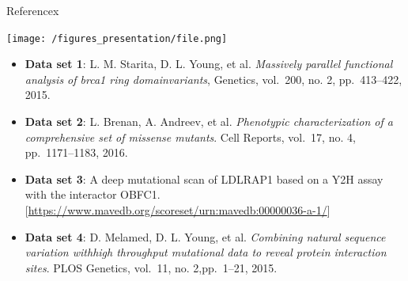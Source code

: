 \documentclass[ignorenonframetext,]{beamer}
\providecommand{\tightlist}{%
  \setlength{\itemsep}{0pt}\setlength{\parskip}{0pt}}
\begin{document}
\begin{frame}{Referencex}
\protect\hypertarget{referencex}{}

\texttt{[image: /figures\_presentation/file.png]}

\begin{itemize}
\tightlist
\item
  \textbf{Data set 1}: L. M. Starita, D. L. Young, et al.
  \emph{Massively parallel functional analysis of brca1 ring
  domainvariants}, Genetics, vol.~200, no. 2, pp.~413--422, 2015. 
\item
  \textbf{Data set 2}: L. Brenan, A. Andreev, et al. \emph{Phenotypic
  characterization of a comprehensive set of missense mutants}. Cell
  Reports, vol.~17, no. 4, pp.~1171--1183, 2016. 
\item
  \textbf{Data set 3}: A deep mutational scan of LDLRAP1 based on a Y2H
  assay with the interactor OBFC1.
  {[}\url{https://www.mavedb.org/scoreset/urn:mavedb:00000036-a-1/}{]} 
\item
  \textbf{Data set 4}: D. Melamed, D. L. Young, et al. \emph{Combining
  natural sequence variation withhigh throughput mutational data to
  reveal protein interaction sites}. PLOS Genetics, vol.~11, no.
  2,pp.~1--21, 2015. 
\end{itemize}

\end{frame}
\end{document}
